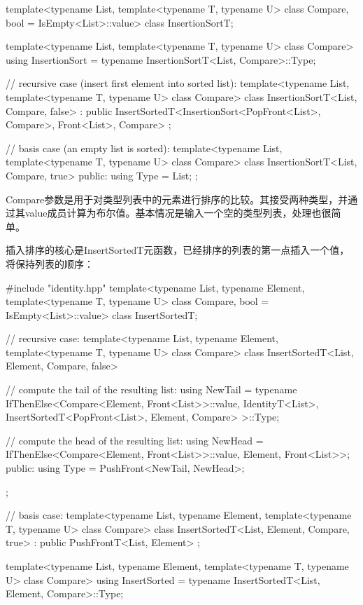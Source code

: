 \begin{cpp}
template<typename List,
		template<typename T, typename U> class Compare,
		bool = IsEmpty<List>::value>
class InsertionSortT;

template<typename List,
		template<typename T, typename U> class Compare>
using InsertionSort = typename InsertionSortT<List, Compare>::Type;

// recursive case (insert first element into sorted list):
template<typename List,
		template<typename T, typename U> class Compare>
class InsertionSortT<List, Compare, false>
: public InsertSortedT<InsertionSort<PopFront<List>, Compare>,
						Front<List>, Compare>
{
};

// basis case (an empty list is sorted):
template<typename List,
		template<typename T, typename U> class Compare>
class InsertionSortT<List, Compare, true>
{
	public:
	using Type = List;
};
\end{cpp}

Compare参数是用于对类型列表中的元素进行排序的比较。其接受两种类型，并通过其value成员计算为布尔值。基本情况是输入一个空的类型列表，处理也很简单。

插入排序的核心是InsertSortedT元函数，已经排序的列表的第一点插入一个值，将保持列表的顺序：

\begin{cpp}
#include "identity.hpp"
template<typename List, typename Element,
		template<typename T, typename U> class Compare,
		bool = IsEmpty<List>::value>
class InsertSortedT;

// recursive case:
template<typename List, typename Element,
		template<typename T, typename U> class Compare>
class InsertSortedT<List, Element, Compare, false>
{
	// compute the tail of the resulting list:
	using NewTail =
		typename IfThenElse<Compare<Element, Front<List>>::value,
							IdentityT<List>,
							InsertSortedT<PopFront<List>, Element, Compare>
				>::Type;
				
	// compute the head of the resulting list:
	using NewHead = IfThenElse<Compare<Element, Front<List>>::value,
								Element,
								Front<List>>;
	public:
	using Type = PushFront<NewTail, NewHead>;
};

// basis case:
template<typename List, typename Element,
		template<typename T, typename U> class Compare>
class InsertSortedT<List, Element, Compare, true>
: public PushFrontT<List, Element>
{
};

template<typename List, typename Element,
		template<typename T, typename U> class Compare>
using InsertSorted = typename InsertSortedT<List, Element, Compare>::Type;
\end{cpp}


